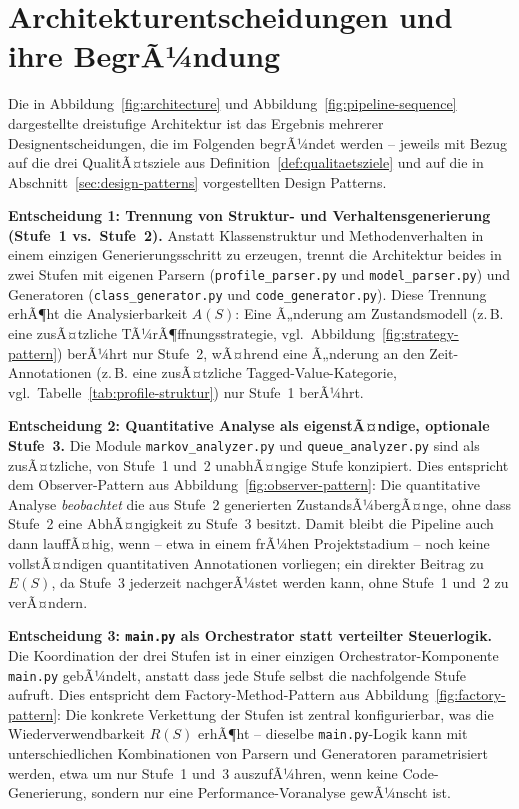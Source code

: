 ﻿\documentclass[a4paper,12pt]{report}
\theoremstyle{definition}
\begin{document}
\section{Architekturentscheidungen und ihre BegrÃ¼ndung}
\label{sec:architekturentscheidungen}

Die in Abbildung~\ref{fig:architecture} und Abbildung~\ref{fig:pipeline-sequence}
dargestellte dreistufige Architektur ist das Ergebnis mehrerer
Designentscheidungen, die im Folgenden begrÃ¼ndet werden -- jeweils mit
Bezug auf die drei QualitÃ¤tsziele aus Definition~\ref{def:qualitaetsziele}
und auf die in Abschnitt~\ref{sec:design-patterns} vorgestellten Design
Patterns.

\textbf{Entscheidung 1: Trennung von Struktur- und Verhaltensgenerierung
(Stufe~1 vs.\ Stufe~2).} Anstatt Klassenstruktur und Methodenverhalten in
einem einzigen Generierungsschritt zu erzeugen, trennt die Architektur
beides in zwei Stufen mit eigenen Parsern (\texttt{profile\_parser.py} und
\texttt{model\_parser.py}) und Generatoren (\texttt{class\_generator.py} und
\texttt{code\_generator.py}). Diese Trennung erhÃ¶ht die Analysierbarkeit
$A(S)$: Eine Ã„nderung am Zustandsmodell (z.\,B. eine zusÃ¤tzliche
TÃ¼rÃ¶ffnungsstrategie, vgl.\ Abbildung~\ref{fig:strategy-pattern}) berÃ¼hrt nur
Stufe~2, wÃ¤hrend eine Ã„nderung an den Zeit-Annotationen (z.\,B. eine
zusÃ¤tzliche Tagged-Value-Kategorie, vgl.\ Tabelle~\ref{tab:profile-struktur})
nur Stufe~1 berÃ¼hrt.

\textbf{Entscheidung 2: Quantitative Analyse als eigenstÃ¤ndige, optionale
Stufe~3.} Die Module \texttt{markov\_analyzer.py} und
\texttt{queue\_analyzer.py} sind als zusÃ¤tzliche, von Stufe~1 und~2
unabhÃ¤ngige Stufe konzipiert. Dies entspricht dem Observer-Pattern aus
Abbildung~\ref{fig:observer-pattern}: Die quantitative Analyse
\emph{beobachtet} die aus Stufe~2 generierten ZustandsÃ¼bergÃ¤nge, ohne dass
Stufe~2 eine AbhÃ¤ngigkeit zu Stufe~3 besitzt. Damit bleibt die Pipeline
auch dann lauffÃ¤hig, wenn -- etwa in einem frÃ¼hen Projektstadium -- noch
keine vollstÃ¤ndigen quantitativen Annotationen vorliegen; ein direkter
Beitrag zu $E(S)$, da Stufe~3 jederzeit nachgerÃ¼stet werden kann, ohne
Stufe~1 und~2 zu verÃ¤ndern.

\textbf{Entscheidung 3: \texttt{main.py} als Orchestrator statt verteilter
Steuerlogik.} Die Koordination der drei Stufen ist in einer einzigen
Orchestrator-Komponente \texttt{main.py} gebÃ¼ndelt, anstatt dass jede Stufe
selbst die nachfolgende Stufe aufruft. Dies entspricht dem
Factory-Method-Pattern aus Abbildung~\ref{fig:factory-pattern}: Die
konkrete Verkettung der Stufen ist zentral konfigurierbar, was die
Wiederverwendbarkeit $R(S)$ erhÃ¶ht -- dieselbe \texttt{main.py}-Logik kann
mit unterschiedlichen Kombinationen von Parsern und Generatoren
parametrisiert werden, etwa um nur Stufe~1 und~3 auszufÃ¼hren, wenn keine
Code-Generierung, sondern nur eine Performance-Voranalyse gewÃ¼nscht ist.
\end{document}

